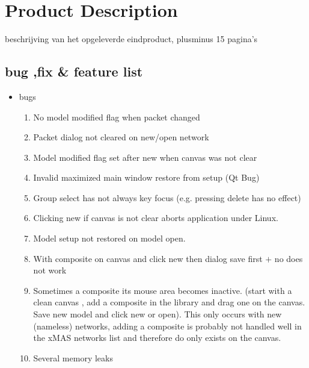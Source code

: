 \section{Product Description}

beschrijving van het opgeleverde eindproduct, plusminus 15 pagina’s

\subsection{bug ,fix \& feature list}
\begin{itemize}
\item	bugs
\begin{enumerate}
\item	No model modified flag when packet changed
\item	Packet dialog not cleared on new/open network
\item	Model modified flag set after new when canvas was not clear
\item	Invalid maximized main window restore from setup (Qt Bug)
\item	Group select has not always key focus (e.g. pressing delete has no effect)
\item	Clicking new if canvas is not clear aborts application under Linux.
\item	Model setup not restored on model open.
\item With composite on canvas and click new then dialog save first $+$ no does not
work
\item Sometimes a composite its mouse area becomes inactive. (start with a clean
canvas , add a composite in the library and drag one on the canvas. Save new
model and click new or open). This only occurs with new (nameless) networks,
adding a composite is probably not handled well in the xMAS networks list and
therefore do only exists on the canvas.
\item	Several memory leaks
\end{enumerate}


\end{itemize}
